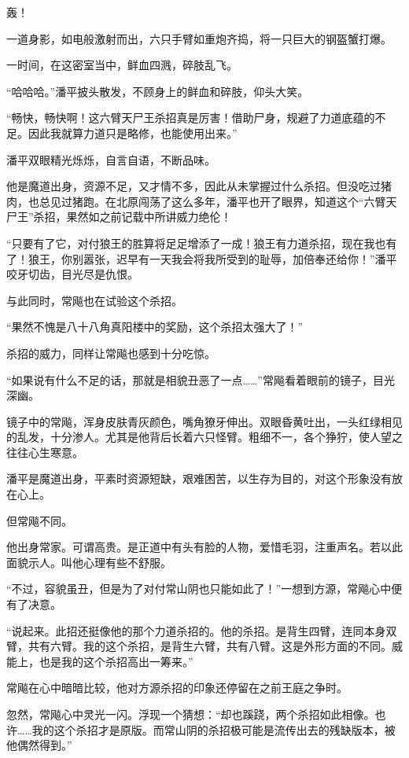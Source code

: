 
\begin{this_body}

轰！

一道身影，如电般激射而出，六只手臂如重炮齐捣，将一只巨大的钢盔蟹打爆。

一时间，在这密室当中，鲜血四溅，碎肢乱飞。

“哈哈哈。”潘平披头散发，不顾身上的鲜血和碎肢，仰头大笑。

“畅快，畅快啊！这六臂天尸王杀招真是厉害！借助尸身，规避了力道底蕴的不足。因此我就算力道只是略修，也能使用出来。”

潘平双眼精光烁烁，自言自语，不断品味。

他是魔道出身，资源不足，又才情不多，因此从未掌握过什么杀招。但没吃过猪肉，也总见过猪跑。在北原闯荡了这么多年，潘平也开了眼界，知道这个“六臂天尸王”杀招，果然如之前记载中所讲威力绝伦！

“只要有了它，对付狼王的胜算将足足增添了一成！狼王有力道杀招，现在我也有了！狼王，你别嚣张，迟早有一天我会将我所受到的耻辱，加倍奉还给你！”潘平咬牙切齿，目光尽是仇恨。

与此同时，常飚也在试验这个杀招。

“果然不愧是八十八角真阳楼中的奖励，这个杀招太强大了！”

杀招的威力，同样让常飚也感到十分吃惊。

“如果说有什么不足的话，那就是相貌丑恶了一点……”常飚看着眼前的镜子，目光深幽。

镜子中的常飚，浑身皮肤青灰颜色，嘴角獠牙伸出。双眼昏黄吐出，一头红绿相见的乱发，十分渗人。尤其是他背后长着六只怪臂。粗细不一，各个狰狞，使人望之往往心生寒意。

潘平是魔道出身，平素时资源短缺，艰难困苦，以生存为目的，对这个形象没有放在心上。

但常飚不同。

他出身常家。可谓高贵。是正道中有头有脸的人物，爱惜毛羽，注重声名。若以此面貌示人。叫他心理有些不舒服。

“不过，容貌虽丑，但是为了对付常山阴也只能如此了！”一想到方源，常飚心中便有了决意。

“说起来。此招还挺像他的那个力道杀招的。他的杀招。是背生四臂，连同本身双臂，共有六臂。我的这个杀招，是背生六臂，共有八臂。这是外形方面的不同。威能上，也是我的这个杀招高出一筹来。”

常飚在心中暗暗比较，他对方源杀招的印象还停留在之前王庭之争时。

忽然，常飚心中灵光一闪。浮现一个猜想：“却也蹊跷，两个杀招如此相像。也许……我的这个杀招才是原版。而常山阴的杀招极可能是流传出去的残缺版本，被他偶然得到。”


\end{this_body}
